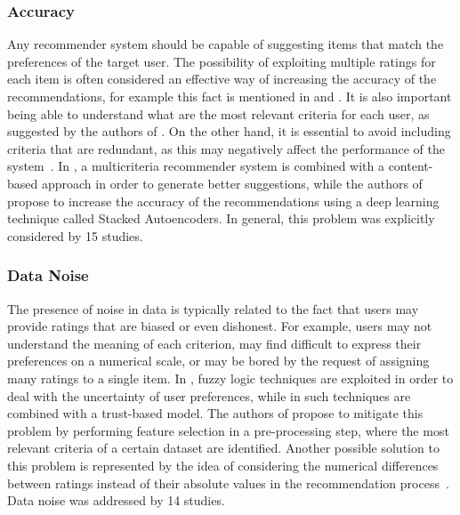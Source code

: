 \subsubsection{Accuracy}
Any recommender system should be capable of suggesting items that match the preferences of the target user. The possibility of exploiting multiple ratings for each item is often considered an effective way of increasing the accuracy of the recommendations, for example this fact is mentioned in  and . It is also important being able to understand what are the most relevant criteria for each user, as suggested by the authors of . On the other hand, it is essential to avoid including criteria that are redundant, as this may negatively affect the performance of the system~. In , a multicriteria recommender system is combined with a content-based approach in order to generate better suggestions, while the authors of  propose to increase the accuracy of the recommendations using a deep learning technique called Stacked Autoencoders. In general, this problem was explicitly considered by 15 studies.

\subsubsection{Data Noise}
The presence of noise in data is typically related to the fact that users may provide ratings that are biased or even dishonest. For example, users may not understand the meaning of each criterion, may find difficult to express their preferences on a numerical scale, or may be bored by the request of assigning many ratings to a single item. In , fuzzy logic techniques are exploited in order to deal with the uncertainty of user preferences, while in  such techniques are combined with a trust-based model. The authors of  propose to mitigate this problem by performing feature selection in a pre-processing step, where the most relevant criteria of a certain dataset are identified. Another possible solution to this problem is represented by the idea of considering the numerical differences between ratings instead of their absolute values in the recommendation process~. Data noise was addressed by 14 studies.

